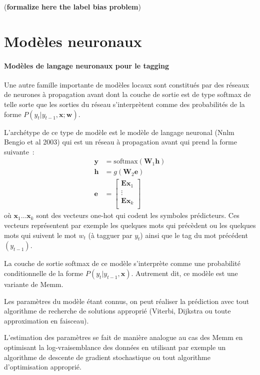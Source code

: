 \documentclass[11pt,openany]{book}
\begin{document}
({\bf formalize here the label bias problem})

\section{Modèles neuronaux}

\paragraph{Modèles de langage neuronaux pour le tagging} Une autre famille importante de modèles locaux sont constitués par des réseaux de neurones à propagation avant dont
la couche de sortie est de type softmax de telle sorte que les sorties du réseau s'interprètent comme des probabilités de la forme
$P(y_t|y_{t-1},\mathbf{x};\mathbf{w})$.

L'archétype de ce type de modèle est le modèle de langage neuronal
({\sc Nnlm} Bengio et al 2003) qui est un réseau à propagation avant qui prend la
forme suivante~:
\begin{align}
\mathbf{y} &= \text{softmax}(\mathbf{W}_1 \mathbf{h})\\
\mathbf{h} &= g(\mathbf{W}_2\mathbf{e})\\
\mathbf{e} &= \left [ 
\begin{array}{c}
\mathbf{E} \mathbf{x}_1\\
\vdots\\
\mathbf{E} \mathbf{x}_k\\
\end{array}\right]
\end{align}
où $\mathbf{x}_1 \ldots \mathbf{x}_k$  sont des vecteurs one-hot qui
codent les symboles prédicteurs. Ces vecteurs représentent par
exemple les quelques mots qui précèdent ou les quelques mots qui suivent le mot $w_t$ (à
tagguer par $y_t$) ainsi que le tag du mot précédent $(y_{t-1})$.

La couche de sortie softmax de ce modèle s'interprète comme une
probabilité conditionnelle de la forme $P(y_t |
y_{t-1},\mathbf{x})$. Autrement dit, ce modèle est une variante de
{\sc Memm}.

Les paramètres du modèle étant connus, on peut réaliser la prédiction avec tout algorithme de recherche de solutions approprié
(Viterbi, Dijkstra ou toute approximation en faisceau).

L'estimation des paramètres se fait de manière analogue au cas des
{\sc Memm} en optimisant la log-vraisemblance des données en utilisant par exemple un algorithme de descente
de gradient stochastique ou tout algorithme d'optimisation approprié.
\end{document}
